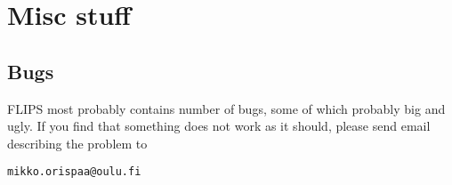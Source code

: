 \documentclass[a4paper,twoside]{refrep}
\begin{document}





\chapter{Misc stuff}

\section{Bugs}

FLIPS most probably contains number of bugs, some of which probably big and ugly. If you find that something does not work as it should, please send email describing the problem to

\begin{verbatim}
mikko.orispaa@oulu.fi
\end{verbatim}



\end{document}

